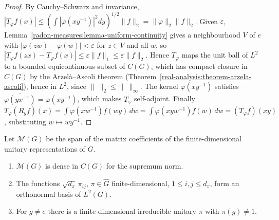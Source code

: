 \begin{proof}
By Cauchy--Schwarz and invariance, $|T_\varphi f(x)| \leq (\int|\varphi(xy^{-1})|^2dy)^{1/2}\|f\|_2 = \|\varphi\|_2\|f\|_2$. Given $\varepsilon$, Lemma~\ref{radon-measures:lemma-uniform-continuity} gives a neighbourhood $V$ of $e$ with
$|\varphi(zw) - \varphi(w)| < \varepsilon$ for $z \in V$ and all $w$, so $|T_\varphi f(zx) - T_\varphi f(x)| \leq \varepsilon\|f\|_1 \leq \varepsilon\|f\|_2$. Hence $T_\varphi$ maps the unit ball of $L^2$ to a bounded equicontinuous subset of
$C(G)$, which has compact closure in $C(G)$ by the Arzel\`a--Ascoli theorem (Theorem~\ref{real-analysis:theorem-arzela-ascoli}), hence in $L^2$, since $\|\ \|_2 \leq \|\ \|_\infty$. The kernel $\varphi(xy^{-1})$ satisfies
$\overline{\varphi(yx^{-1})} = \varphi(xy^{-1})$, which makes $T_\varphi$ self-adjoint. Finally $T_\varphi(R_yf)(x) = \int\varphi(xw^{-1})f(wy)\,dw = \int\varphi(xyw^{-1})f(w)\,dw = (T_\varphi f)(xy)$, substituting $w \mapsto wy^{-1}$.
\end{proof}

\begin{theorem}\label{harmonic-analysis:theorem-peter-weyl}
Let $\mathcal{M}(G)$ be the span of the matrix coefficients of the finite-dimensional unitary representations of $G$.
\begin{enumerate}
\item $\mathcal{M}(G)$ is dense in $C(G)$ for the supremum norm.
\item The functions $\sqrt{d_\pi}\,\pi_{ij}$, $\pi \in \widehat G$ finite-dimensional, $1 \leq i, j \leq d_\pi$, form an orthonormal basis of $L^2(G)$.
\item For $g \neq e$ there is a finite-dimensional irreducible unitary $\pi$ with $\pi(g) \neq 1$.
\end{enumerate}
\end{theorem}


